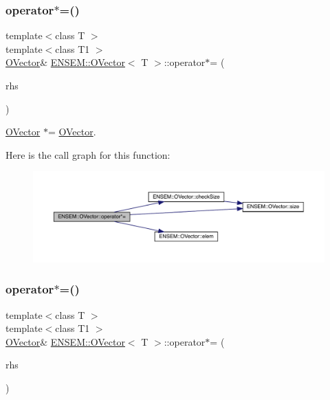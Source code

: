 \subsubsection{\texorpdfstring{operator$\ast$=()}{operator*=()}\hspace{0.1cm}{\footnotesize\ttfamily [3/4]}}
{\footnotesize\ttfamily template$<$class T $>$ \\
template$<$class T1 $>$ \\
\mbox{\hyperlink{classENSEM_1_1OVector}{O\+Vector}}\& \mbox{\hyperlink{classENSEM_1_1OVector}{E\+N\+S\+E\+M\+::\+O\+Vector}}$<$ T $>$\+::operator$\ast$= (\begin{DoxyParamCaption}\item[{const \mbox{\hyperlink{classENSEM_1_1OVector}{O\+Vector}}$<$ T1 $>$ \&}]{rhs }\end{DoxyParamCaption})\hspace{0.3cm}{\ttfamily [inline]}}



\mbox{\hyperlink{classENSEM_1_1OVector}{O\+Vector}} $\ast$= \mbox{\hyperlink{classENSEM_1_1OVector}{O\+Vector}}. 

Here is the call graph for this function\+:
\nopagebreak
\begin{figure}[H]
\begin{center}
\leavevmode
\includegraphics[width=350pt]{d0/d8d/classENSEM_1_1OVector_ab1d7773b4a23e20961ece98c90b915b4_cgraph}
\end{center}
\end{figure}
\mbox{\label{classENSEM_1_1OVector_ab1d7773b4a23e20961ece98c90b915b4}} 
\subsubsection{\texorpdfstring{operator$\ast$=()}{operator*=()}\hspace{0.1cm}{\footnotesize\ttfamily [4/4]}}
{\footnotesize\ttfamily template$<$class T $>$ \\
template$<$class T1 $>$ \\
\mbox{\hyperlink{classENSEM_1_1OVector}{O\+Vector}}\& \mbox{\hyperlink{classENSEM_1_1OVector}{E\+N\+S\+E\+M\+::\+O\+Vector}}$<$ T $>$\+::operator$\ast$= (\begin{DoxyParamCaption}\item[{const \mbox{\hyperlink{classENSEM_1_1OVector}{O\+Vector}}$<$ T1 $>$ \&}]{rhs }\end{DoxyParamCaption})\hspace{0.3cm}{\ttfamily [inline]}}



